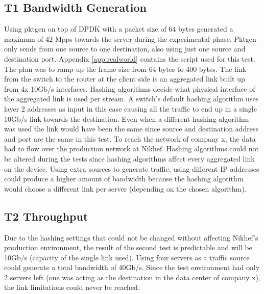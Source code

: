 \subsection{T1 Bandwidth Generation}
Using pktgen on top of DPDK with a packet size of 64 bytes generated a maximum of 42 Mpps towards the server during the experimental phase. 
Pktgen only sends from one source to one destination, also using just one source and destination port. 
Appendix \ref{app:realworld} contains the script used for this test. The plan was to ramp up the frame size from 64 bytes to 400 bytes. 
The link from the switch to the router at the client side is an aggregated link built up from 4x 10Gb/s interfaces. 
Hashing algorithms \cite{hashing} decide what physical interface of the aggregated link is used per stream. 
A switch's default hashing algorithm uses layer 2 addresses as input in this case causing all the traffic to end up in a single 10Gb/s link towards the destination. 
Even when a different hashing algorithm was used the link would have been the same since source and destination address and port are the same in this test. 
To reach the network of company x, the data had to flow over the production network at Nikhef. Hashing algorithms could not be altered during the tests since hashing algorithms affect every aggregated link on the device. 
Using extra sources to generate traffic, using different IP addresses could produce a higher amount of bandwidth because the hashing algorithm would choose a different link per server (depending on the chosen algorithm).  

\subsection{T2 Throughput}
Due to the hashing settings that could not be changed without affecting Nikhef's production environment, the result of the second test is predictable and will be 10Gb/s (capacity of the single link used). 
Using four servers as a traffic source could generate a total bandwidth of 40Gb/s. Since the test environment had only 2 servers left (one was acting as the destination in the data center of company x), the link limitations could never be reached. 

